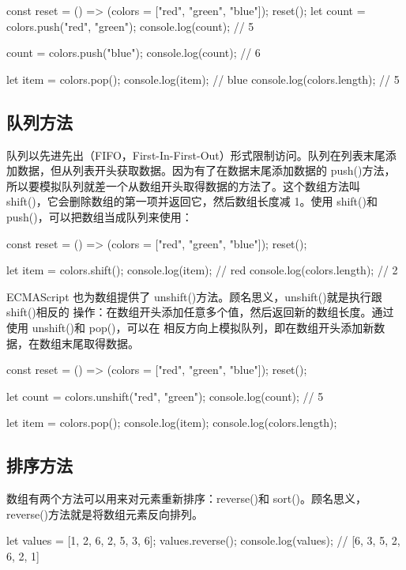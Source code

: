 \begin{js}
    const reset = () => (colors = ["red", "green", "blue"]);
    reset();
    let count = colors.push("red", "green");
    console.log(count); // 5

    count = colors.push("blue");
    console.log(count); // 6

    let item = colors.pop();
    console.log(item); // blue
    console.log(colors.length); // 5
\end{js}
\subsection{队列方法}
队列以先进先出（FIFO，First-In-First-Out）形式限制访问。队列在列表末尾添加数据，但从列表开头获取数据。因为有了在数据末尾添加数据的 push()方法，所以要模拟队列就差一个从数组开头取得数据的方法了。这个数组方法叫 shift()，它会删除数组的第一项并返回它，然后数组长度减 1。使用 shift()和 push()，可以把数组当成队列来使用：

\begin{js}
    const reset = () => (colors = ["red", "green", "blue"]);
    reset();

    let item = colors.shift();
    console.log(item); // red
    console.log(colors.length); // 2
\end{js}

ECMAScript 也为数组提供了 unshift()方法。顾名思义，unshift()就是执行跟 shift()相反的
操作：在数组开头添加任意多个值，然后返回新的数组长度。通过使用 unshift()和 pop()，可以在
相反方向上模拟队列，即在数组开头添加新数据，在数组末尾取得数据。

\begin{js}
    const reset = () => (colors = ["red", "green", "blue"]);
    reset();

    let count = colors.unshift("red", "green");
    console.log(count); // 5

    let item = colors.pop();
    console.log(item);
    console.log(colors.length);
\end{js}
\subsection{排序方法}
数组有两个方法可以用来对元素重新排序：reverse()和 sort()。顾名思义，reverse()方法就是将数组元素反向排列。
\begin{js}
    let values = [1, 2, 6, 2, 5, 3, 6];
    values.reverse();
    console.log(values); // [6, 3, 5, 2, 6, 2, 1]
\end{js}


